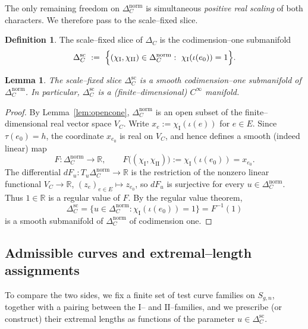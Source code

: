 \documentclass[a4paper,12pt]{amsart}
\newcommand{\R}{\mathbb{R}}
\theoremstyle{plain}
\newtheorem{lemma}[theorem]{Lemma}
\theoremstyle{definition}
\newtheorem{definition}[theorem]{Definition}
\begin{document}
The only remaining freedom on $\Delta_C^{\mathrm{norm}}$ is simultaneous \emph{positive real scaling} of both characters.
We therefore pass to the scale--fixed slice.

\begin{definition}\label{def:DeltaCsc}
The scale--fixed slice of $\Delta_C$ is the codimension--one submanifold
\[
\Delta_C^{\mathrm{sc}}
\ :=\
\Bigl\{(\chi_{\mathrm{I}},\chi_{\mathrm{II}})\in \Delta_C^{\mathrm{norm}}:\ \chi_{\mathrm{I}}(\iota(e_0))=1\Bigr\}.
\]
\end{definition}
\begin{lemma}\label{lem:DeltaCsc_manifold}
The scale--fixed slice $\Delta_C^{\mathrm{sc}}$ is a smooth codimension--one submanifold of
$\Delta_C^{\mathrm{norm}}$. In particular, $\Delta_C^{\mathrm{sc}}$ is a (finite--dimensional) $C^\infty$ manifold.
\end{lemma}

\begin{proof}
By Lemma~\ref{lem:opencone}, $\Delta_C^{\mathrm{norm}}$ is an open subset of the finite--dimensional real vector space
$V_C$. Write $x_e:=\chi_{\mathrm{I}}(\iota(e))$ for $e\in E$. Since $\tau(e_0)=h$, the coordinate $x_{e_0}$ is real on
$V_C$, and hence defines a smooth (indeed linear) map
\[
F:\Delta_C^{\mathrm{norm}}\longrightarrow \R,\qquad
F\bigl((\chi_{\mathrm{I}},\chi_{\mathrm{II}})\bigr):=\chi_{\mathrm{I}}(\iota(e_0))=x_{e_0}.
\]
The differential $dF_u:T_u\Delta_C^{\mathrm{norm}}\to\R$ is the restriction of the nonzero linear functional
$V_C\to\R$, $(z_e)_{e\in E}\mapsto z_{e_0}$, so $dF_u$ is surjective for every $u\in\Delta_C^{\mathrm{norm}}$.
Thus $1\in\R$ is a regular value of $F$. By the regular value theorem,
\[
\Delta_C^{\mathrm{sc}}
=\bigl\{u\in\Delta_C^{\mathrm{norm}}:\chi_{\mathrm{I}}(\iota(e_0))=1\bigr\}
=F^{-1}(1)
\]
is a smooth submanifold of $\Delta_C^{\mathrm{norm}}$ of codimension one.
\end{proof}

\subsection{Admissible curves and extremal--length assignments}

To compare the two sides, we fix a finite set of test curve families on $S_{g,n}$, together with a pairing
between the $\mathrm{I}$-- and $\mathrm{II}$--families, and we prescribe (or construct) their extremal lengths as functions of
the parameter $u\in\Delta_C^{\mathrm{sc}}$.
\end{document}
